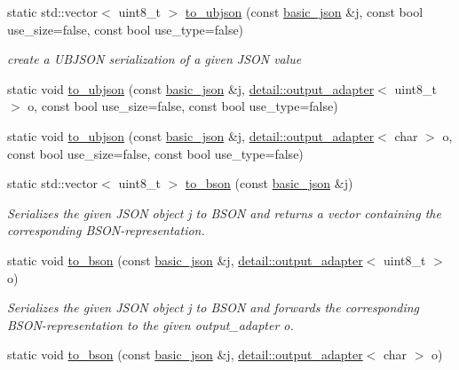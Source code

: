 \begin{DoxyCompactItemize}
static std\+::vector$<$ uint8\+\_\+t $>$ \hyperlink{classnlohmann_1_1basic__json_ae1ece6c2059114eac10873f13ef19185}{to\+\_\+ubjson} (const \hyperlink{classnlohmann_1_1basic__json}{basic\+\_\+json} \&j, const bool use\+\_\+size=false, const bool use\+\_\+type=false)
\begin{DoxyCompactList}\small\item\em create a U\+B\+J\+S\+ON serialization of a given J\+S\+ON value \end{DoxyCompactList}\item 
static void \hyperlink{classnlohmann_1_1basic__json_a480f6d5a30b9627b55831178266575a7}{to\+\_\+ubjson} (const \hyperlink{classnlohmann_1_1basic__json}{basic\+\_\+json} \&j, \hyperlink{classnlohmann_1_1detail_1_1output__adapter}{detail\+::output\+\_\+adapter}$<$ uint8\+\_\+t $>$ o, const bool use\+\_\+size=false, const bool use\+\_\+type=false)
\item 
static void \hyperlink{classnlohmann_1_1basic__json_af66db22ad819346a688042a9da68ee5f}{to\+\_\+ubjson} (const \hyperlink{classnlohmann_1_1basic__json}{basic\+\_\+json} \&j, \hyperlink{classnlohmann_1_1detail_1_1output__adapter}{detail\+::output\+\_\+adapter}$<$ char $>$ o, const bool use\+\_\+size=false, const bool use\+\_\+type=false)
\item 
static std\+::vector$<$ uint8\+\_\+t $>$ \hyperlink{classnlohmann_1_1basic__json_a8ca5dd4f18b59e7022b04fd9bf7f5176}{to\+\_\+bson} (const \hyperlink{classnlohmann_1_1basic__json}{basic\+\_\+json} \&j)
\begin{DoxyCompactList}\small\item\em Serializes the given J\+S\+ON object {\ttfamily j} to B\+S\+ON and returns a vector containing the corresponding B\+S\+O\+N-\/representation. \end{DoxyCompactList}\item 
static void \hyperlink{classnlohmann_1_1basic__json_a51df13f73a970da95c3dcb3d47b0c2c4}{to\+\_\+bson} (const \hyperlink{classnlohmann_1_1basic__json}{basic\+\_\+json} \&j, \hyperlink{classnlohmann_1_1detail_1_1output__adapter}{detail\+::output\+\_\+adapter}$<$ uint8\+\_\+t $>$ o)
\begin{DoxyCompactList}\small\item\em Serializes the given J\+S\+ON object {\ttfamily j} to B\+S\+ON and forwards the corresponding B\+S\+O\+N-\/representation to the given output\+\_\+adapter {\ttfamily o}. \end{DoxyCompactList}\item 
static void \hyperlink{classnlohmann_1_1basic__json_aeb988f5b2148875ed1c9cb32bec156c6}{to\+\_\+bson} (const \hyperlink{classnlohmann_1_1basic__json}{basic\+\_\+json} \&j, \hyperlink{classnlohmann_1_1detail_1_1output__adapter}{detail\+::output\+\_\+adapter}$<$ char $>$ o)

\end{DoxyCompactItemize}
